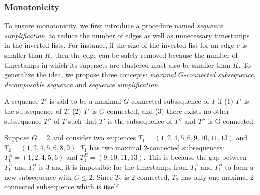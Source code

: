 \subsubsection{Monotonicity}
To ensure monotonicity, we first introduce a procedure named \textit{sequence simplification}, to reduce the number of edges as well as unnecessary timestamps in the inverted lists. For instance, if the size of the inverted list for an edge $e$ is smaller than $K$, then the edge can be safely removed because the number of timestamps in which its supersets are clustered must also be smaller than $K$. To generalize the idea, we propose three concepts: \textit{maximal $G$-connected subsequence}, \emph{decomposable sequence} and \emph{sequence simplification}.

\begin{definition}
A sequence $T'$ is said to be a maximal $G$-connected subsequence of $T$ if (1) $T'$ is the subsequence of $T$, (2) $T'$ is $G$-connected, and (3) there exists no other subsequence $T''$ of $T$ such that $T'$ is the subsequence of $T''$ and $T''$ is G-connected.
\end{definition}

\begin{example}
Suppose $G=2$ and consider two sequences $T_1=(1,2,4,5,6,9,10,11,13)$ and $T_2=(1,2,4,5,6,8,9)$. $T_1$ has two maximal $2$-connected subsequences:$T_1^A=(1,2,4,5,6)$ and $T_1^B=(9,10,11,13)$. This is because the gap between $T_1^A$ and $T_1^B$ is $3$ and it is impossible for the timestamps from  $T_1^A$ and $T_1^B$ to form a new subsequence with $G\leq 2$. Since $T_2$ is $2$-connected, $T_2$ has only one maximal $2$-connected subsequence which is
itself. 
\end{example}

